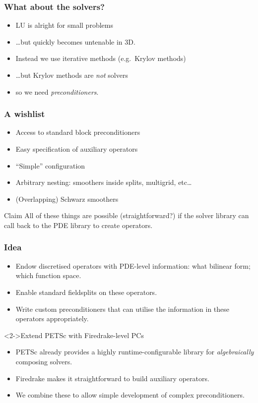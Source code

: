 \documentclass[presentation,aspectratio=43]{beamer}
\begin{document}
\begin{frame}[t]
  \frametitle{What about the solvers?}
  \begin{itemize}
  \item LU is alright for small problems
  \item \dots but quickly becomes untenable in 3D.
  \item Instead we use iterative methods (e.g.~Krylov methods)
  \item<2-> \dots but Krylov methods are \emph{not} solvers
  \item<3-> so we need \emph{preconditioners}.
  \end{itemize}
\end{frame}

\begin{frame}
  \frametitle{A wishlist}
  \begin{itemize}
  \item Access to standard block preconditioners
  \item Easy specification of auxiliary operators
  \item ``Simple'' configuration
  \item Arbitrary nesting: smoothers inside splits, multigrid, etc\ldots
  \item (Overlapping) Schwarz smoothers
  \end{itemize}

  \begin{block}{Claim}
    All of these things are possible (straightforward?) if the solver
    library can call back to the PDE library to create operators.
  \end{block}
\end{frame}

\begin{frame}
  \frametitle{Idea}
  \begin{itemize}
  \item Endow discretised operators with PDE-level information: what
    bilinear form; which function space.
  \item Enable standard fieldsplits on these operators.
  \item Write custom preconditioners that can utilise the information
    in these operators appropriately.
  \end{itemize}
  \begin{block}<2->{Extend PETSc with Firedrake-level PCs}
  \begin{itemize}
  \item PETSc already provides a highly runtime-configurable library
    for \emph{algebraically} composing solvers. \nocite{Brown:2012}

  \item Firedrake makes it straightforward to build auxiliary
    operators.

  \item We combine these to allow simple development of complex
    preconditioners.
  \end{itemize}
  \end{block}
\end{frame}
\end{document}
